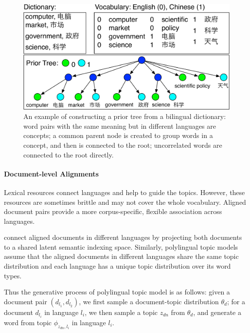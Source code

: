 \begin{figure}
\centering
\includegraphics[width=0.9\linewidth]{figures/correlations_tree-crop.pdf}
\vspace{-3mm}
\caption[Constructing prior tree from a bilingual dictionary]{An example of constructing a prior tree from a
  bilingual dictionary: word pairs with the same meaning but in
  different languages are concepts; a common parent node is created to
  group words in a concept, and then is connected to the root;
  uncorrelated words are connected to the root directly.}
\label{fig:prior_trees}
\end{figure}


\paragraph{\bf Document-level Alignments}

Lexical resources connect languages and help to guide the
topics. However, these resources are sometimes brittle and may not
cover the whole vocabulary. Aligned document pairs provide a more
corpus-specific, flexible association across languages.

\citet{Landauer-1990} connect aligned documents in different languages
by projecting both documents to a shared latent semantic indexing
space. Similarly, polylingual topic models~\citep[\plda{}]{mimno-09}
assume that the aligned documents in different languages share the
same topic distribution and each language has a unique topic
distribution over its word types.

Thus the generative process of polylingual topic model is as follows:
given a document pair $(d_{l_1}, d_{l_2})$, we first sample a
document-topic distribution $\theta_d$; for a document $d_{l_i}$ in
language $l_i$, we then sample a topic $z_{dn}$ from $\theta_d$, and
generate a word from topic $\phi_{z_{dn}, l_i}$ in language $l_i$.

